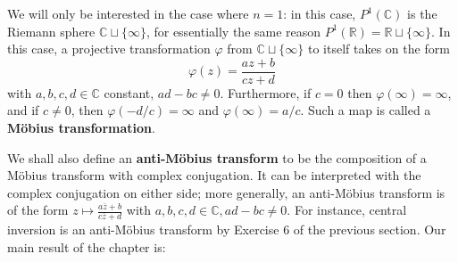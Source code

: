 \documentclass[leqno]{book}
\begin{document}
We will only be interested in the case where $n=1$: in this case, $P^1(\mathbb C)$ is the Riemann sphere $\mathbb C\sqcup\{\infty\}$, for essentially the same reason $P^1(\mathbb R)=\mathbb R\sqcup\{\infty\}$.  In this case, a projective transformation $\varphi$ from $\mathbb C\sqcup\{\infty\}$ to itself takes on the form
$$\varphi(z)=\frac{az+b}{cz+d}$$
with $a,b,c,d\in\mathbb C$ constant, $ad-bc\ne 0$.  Furthermore, if $c=0$ then $\varphi(\infty)=\infty$, and if $c\ne 0$, then $\varphi(-d/c)=\infty$ and $\varphi(\infty)=a/c$.  Such a map is called a \textbf{M\"obius transformation}.

We shall also define an \textbf{anti-M\"obius transform} to be the composition of a M\"obius transform with complex conjugation.  It can be interpreted with the complex conjugation on either side; more generally, an anti-M\"obius transform is of the form $z\mapsto\frac{a\overline z+b}{c\overline z+d}$ with $a,b,c,d\in\mathbb C,ad-bc\ne 0$.  For instance, central inversion is an anti-M\"obius transform by Exercise 6 of the previous section.  Our main result of the chapter is:\\
\end{document}
